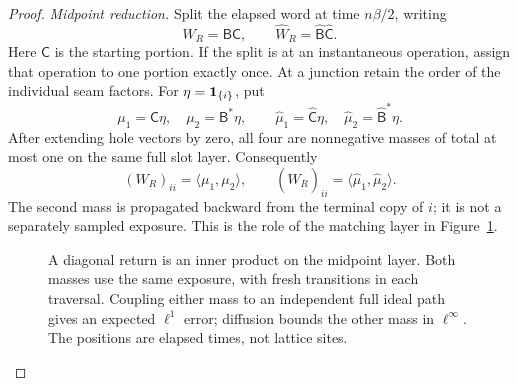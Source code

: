 \begin{proof}
\emph{Midpoint reduction.}
Split the elapsed word at time \(n\beta/2\), writing
\[
 W_R=\mathsf B\mathsf C,\qquad
 \widehat W_R=\widehat{\mathsf B}\widehat{\mathsf C}.
\]
Here \(\mathsf C\) is the starting portion. If the split is at an
instantaneous operation, assign that operation to one portion exactly
once. At a junction retain the order of the individual seam factors.
For \(\eta=\mathbf1_{\{i\}}\), put
\[
 \mu_1=\mathsf C\eta,\quad \mu_2=\mathsf B^*\eta,\qquad
 \widehat\mu_1=\widehat{\mathsf C}\eta,\quad
 \widehat\mu_2=\widehat{\mathsf B}^*\eta.
\]
After extending hole vectors by zero, all four are nonnegative masses
of total at most one on the same full slot layer. Consequently
\begin{equation}\label{eq:midpoint-pairings}
 (W_R)_{ii}=\langle\mu_1,\mu_2\rangle,\qquad
 (\widehat W_R)_{ii}=\langle\widehat\mu_1,\widehat\mu_2\rangle.
\end{equation}
The second mass is propagated backward from the terminal copy of
\(i\); it is not a separately sampled exposure. This is the role of
the matching layer in Figure~\ref{fig:midpoint}.

\begin{figure}[htbp]
\centering
{}
\caption{A diagonal return is an inner product on the midpoint layer.
Both masses use the same exposure, with fresh transitions in each
traversal. Coupling either mass to an independent full ideal path gives
an expected \(\ell^1\) error; diffusion bounds the other mass in
\(\ell^\infty\). The positions are elapsed times, not lattice sites.}
\label{fig:midpoint}
\end{figure}


\end{proof}
